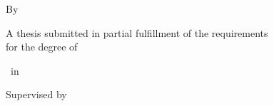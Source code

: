 \begin{titlepage}
\centering
\thispagestyle{empty}
{\large\ThesisInstitution\par}
{\normalsize\ThesisDepartment\par}
\vspace{2.2cm}
{\LARGE\bfseries{}\ThesisTitle\par}
\vspace{1.8cm}
{\normalsize By\par}
\vspace{0.3cm}
{\Large\ThesisAuthor\par}
\vspace{1.8cm}
{\normalsize A thesis submitted in partial fulfillment of the requirements\\ for the degree of\par}
\vspace{0.3cm}
{\large\ThesisDegree\ in \ThesisField\par}
\vspace{1.8cm}
{\normalsize Supervised by\par}
\vspace{0.4cm}
{\large\SupervisorOne\par}
{\small\SupervisorOneAffil\par}
\vspace{0.4cm}
{\large\SupervisorTwo\par}
{\small\SupervisorTwoAffil\par}
\vfill
{\normalsize\ThesisCity\par}
{\normalsize\ThesisYear\par}
\end{titlepage}
